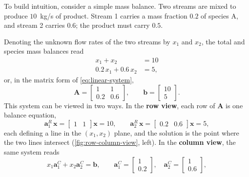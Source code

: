 To build intuition, consider a simple mass balance.
Two streams are mixed to produce $10$~kg/s of product.
Stream 1 carries a mass fraction $0.2$ of species A, and stream 2 carries $0.6$; the product must carry $0.5$.
\begin{center}
\end{center}
Denoting the unknown flow rates of the two streams by $x_1$ and $x_2$, the total and species mass balances read
\begin{align*}
    x_1 + x_2 &= 10 \\
    0.2\, x_1 + 0.6\, x_2 &= 5,
\end{align*}
or, in the matrix form of \cref{eq:linear-system},
\begin{equation*}
    \mathbf{A} = \begin{bmatrix} 1 & 1 \\ 0.2 & 0.6 \end{bmatrix},
    \qquad
    \mathbf{b} = \begin{bmatrix} 10 \\ 5 \end{bmatrix}.
\end{equation*}
This system can be viewed in two ways.
In the \textbf{row view}, each row of $\mathbf{A}$ is one balance equation,
\begin{equation*}
    \mathbf{a}^R_1\, \mathbf{x} = \begin{bmatrix} 1 & 1 \end{bmatrix} \mathbf{x} = 10,
    \qquad
    \mathbf{a}^R_2\, \mathbf{x} = \begin{bmatrix} 0.2 & 0.6 \end{bmatrix} \mathbf{x} = 5,
\end{equation*}
each defining a line in the $(x_1, x_2)$ plane, and the solution is the point where the two lines intersect (\autoref{fig:row-column-view}, left).
In the \textbf{column view}, the same system reads
\begin{equation*}
    x_1 \mathbf{a}^C_1 + x_2 \mathbf{a}^C_2 = \mathbf{b},
    \qquad
    \mathbf{a}^C_1 = \begin{bmatrix} 1 \\ 0.2 \end{bmatrix},
    \quad
    \mathbf{a}^C_2 = \begin{bmatrix} 1 \\ 0.6 \end{bmatrix},
\end{equation*}
